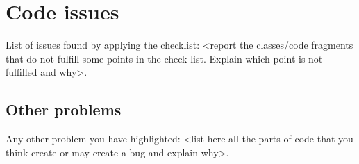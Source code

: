 \chapter{Code issues}
List of issues found by applying the checklist: <report the classes/code
fragments that do not fulfill some points in the check list. Explain which point is
not fulfilled and why>.



\section{Other problems}
Any other problem you have highlighted: <list here all the parts of code that
you think create or may create a bug and explain why>.
